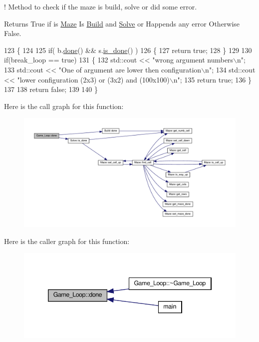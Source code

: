 ! Method to check if the maze is build, solve or did some error. 

\begin{DoxyReturn}{Returns}
True if is \hyperlink{classMaze}{Maze} Is \hyperlink{classBuild}{Build} and \hyperlink{classSolve}{Solve} or Happends any error Otherwise False. 
\end{DoxyReturn}

\begin{DoxyCode}
123 \{
124 
125     \textcolor{keywordflow}{if}( b.\hyperlink{classBuild_a72373ff38b0676c8f2c9f171c15333c4}{done}() && s.\hyperlink{classSolve_a868db181d288fdb10e5592b62e669c3b}{is\_done}() )
126     \{
127         \textcolor{keywordflow}{return} \textcolor{keyword}{true};
128     \}
129 
130     \textcolor{keywordflow}{if}(break\_loop == \textcolor{keyword}{true})
131     \{
132         std::cout << \textcolor{stringliteral}{"wrong argument numbers\(\backslash\)n"};
133         std::cout << \textcolor{stringliteral}{"One of argument are lower then configuration\(\backslash\)n"};
134         std::cout << \textcolor{stringliteral}{"lower configuration (2x3) or (3x2) and (100x100)\(\backslash\)n"};
135         \textcolor{keywordflow}{return} \textcolor{keyword}{true};
136     \}
137 
138     \textcolor{keywordflow}{return} \textcolor{keyword}{false};
139 
140 \}
\end{DoxyCode}
Here is the call graph for this function\+:\nopagebreak
\begin{figure}[H]
\begin{center}
\leavevmode
\includegraphics[width=350pt]{classGame__Loop_a197233063165098c509b47d9b1da3a36_cgraph}
\end{center}
\end{figure}
Here is the caller graph for this function\+:\nopagebreak
\begin{figure}[H]
\begin{center}
\leavevmode
\includegraphics[width=346pt]{classGame__Loop_a197233063165098c509b47d9b1da3a36_icgraph}
\end{center}
\end{figure}
